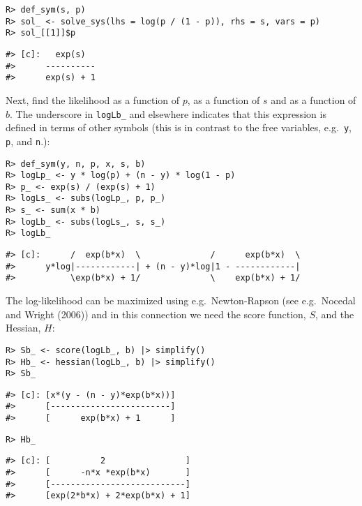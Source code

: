 \begin{verbatim}
R> def_sym(s, p)
R> sol_ <- solve_sys(lhs = log(p / (1 - p)), rhs = s, vars = p)
R> sol_[[1]]$p
\end{verbatim}

\begin{verbatim}
#> [c]:   exp(s)  
#>      ----------
#>      exp(s) + 1
\end{verbatim}

Next, find the likelihood as a function of \(p\), as a function of \(s\) and as a function of \(b\).
The underscore in \texttt{logLb\_} and elsewhere indicates that this expression
is defined in terms of other symbols (this is in contrast
to the free variables, e.g.~\texttt{y}, \texttt{p}, and \texttt{n}.):

\begin{verbatim}
R> def_sym(y, n, p, x, s, b)
R> logLp_ <- y * log(p) + (n - y) * log(1 - p)
R> p_ <- exp(s) / (exp(s) + 1)
R> logLs_ <- subs(logLp_, p, p_)
R> s_ <- sum(x * b)
R> logLb_ <- subs(logLs_, s, s_)
R> logLb_
\end{verbatim}

\begin{verbatim}
#> [c]:      /  exp(b*x)  \              /      exp(b*x)  \
#>      y*log|------------| + (n - y)*log|1 - ------------|
#>           \exp(b*x) + 1/              \    exp(b*x) + 1/
\end{verbatim}

The log-likelihood can be maximized using e.g.~Newton-Rapson (see e.g.~Nocedal and Wright (2006)) and in this connection we
need the score function, \(S\), and the Hessian, \(H\):

\begin{verbatim}
R> Sb_ <- score(logLb_, b) |> simplify()
R> Hb_ <- hessian(logLb_, b) |> simplify()
R> Sb_
\end{verbatim}

\begin{verbatim}
#> [c]: [x*(y - (n - y)*exp(b*x))]
#>      [------------------------]
#>      [      exp(b*x) + 1      ]
\end{verbatim}

\begin{verbatim}
R> Hb_
\end{verbatim}

\begin{verbatim}
#> [c]: [          2                ]
#>      [      -n*x *exp(b*x)       ]
#>      [---------------------------]
#>      [exp(2*b*x) + 2*exp(b*x) + 1]
\end{verbatim}

